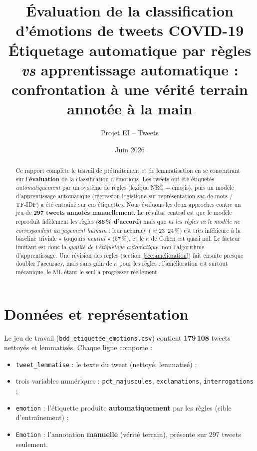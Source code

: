 \documentclass[11pt,a4paper]{article}
\title{\textbf{Évaluation de la classification d'émotions de tweets COVID-19}\\
\large Étiquetage automatique par règles \emph{vs} apprentissage automatique :\\
confrontation à une vérité terrain annotée à la main}
\author{Projet EI -- Tweets}
\date{Juin 2026}
\begin{document}
\maketitle

\begin{abstract}
\noindent
Ce rapport complète le travail de prétraitement et de lemmatisation
en se concentrant sur l'\textbf{évaluation} de la classification d'émotions.
Les tweets ont été étiquetés \emph{automatiquement} par un système de règles
(lexique NRC + émojis), puis un modèle d'apprentissage automatique (régression
logistique sur représentation sac-de-mots / TF-IDF) a été entraîné sur ces
étiquettes. Nous évaluons les deux approches contre un jeu de \textbf{297 tweets
annotés manuellement}. Le résultat central est que le modèle reproduit fidèlement
les règles (\textbf{86\,\% d'accord}) mais que \emph{ni les règles ni le modèle ne
correspondent au jugement humain} : leur accuracy ($\approx 23$--$24\,\%$) est
très inférieure à la baseline triviale « toujours \emph{neutral} » ($57\,\%$),
et le $\kappa$ de Cohen est quasi nul. Le facteur limitant est donc la
\emph{qualité de l'étiquetage automatique}, non l'algorithme d'apprentissage.
Une révision des règles (section~\ref{sec:amelioration}) fait ensuite presque
doubler l'accuracy, mais sans gain de $\kappa$ pour les règles : l'amélioration
est surtout mécanique, le ML étant le seul à progresser réellement.
\end{abstract}

\section{Données et représentation}

Le jeu de travail (\texttt{bdd\_etiquetee\_emotions.csv}) contient
\textbf{179\,108} tweets nettoyés et lemmatisés. Chaque ligne comporte :
\begin{itemize}
  \item \texttt{tweet\_lemmatise} : le texte du tweet (nettoyé, lemmatisé) ;
  \item trois variables numériques : \texttt{pct\_majuscules},
        \texttt{exclamations}, \texttt{interrogations} ;
  \item \texttt{emotion} : l'étiquette produite \textbf{automatiquement} par les
        règles (cible d'entraînement) ;
  \item \texttt{Emotion} : l'annotation \textbf{manuelle} (vérité terrain),
        présente sur 297 tweets seulement.
\end{itemize}
\end{document}
